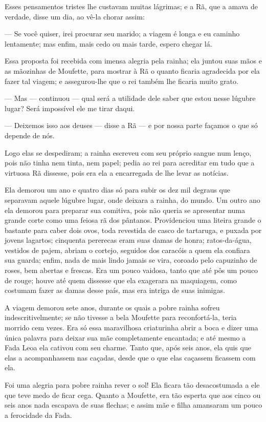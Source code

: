 Esses pensamentos tristes lhe custavam muitas lágrimas; e a Rã, que a
amava de verdade, disse um dia, ao vê-la chorar assim:

— Se você quiser, irei procurar seu marido; a viagem é longa e eu
caminho lentamente; mas enfim, mais cedo ou mais tarde, espero chegar
lá.

Essa proposta foi recebida com imensa alegria pela rainha; ela juntou
suas mãos e as mãozinhas de Moufette, para mostrar à Rã o quanto
ficaria agradecida por ela fazer tal viagem; e assegurou-lhe que o
rei também lhe ficaria muito grato. 

— Mas — continuou — qual será a utilidade dele saber que estou nesse
lúgubre lugar? Será impossível ele me tirar daqui.

— Deixemos isso aos deuses — disse a Rã — e por nossa parte façamos o
que só depende de nós.

Logo elas se despediram; a rainha escreveu com seu próprio sangue num
lenço, pois não tinha nem tinta, nem papel; pedia ao rei para
acreditar em tudo que a virtuosa Rã dissesse, pois era ela a
encarregada de lhe levar as notícias.

Ela demorou um ano e quatro dias só para subir os dez mil degraus que
separavam aquele lúgubre lugar, onde deixara a rainha, do mundo. Um
outro ano ela demorou para preparar sua comitiva, pois não queria se
apresentar numa grande corte como uma feiosa rã dos pântanos.
Providenciou uma liteira grande o bastante para caber dois ovos, toda
revestida de casco de tartaruga, e puxada por jovens lagartos;
cinquenta pererecas eram suas damas de honra; ratos-da-água, vestidos
de pajem, abriam o cortejo, seguidos dos caracóis a quem ela confiara
sua guarda; enfim, nada de mais lindo jamais se vira, coroado pelo
capuzinho de roses, bem abertas e frescas. Era um pouco vaidosa,
tanto que até pôs um pouco de rouge; houve até quem dissesse que ela
exagerara na maquiagem, como costumam fazer as damas desse país, mas
era intriga de suas inimigas.

A viagem demorou sete anos, durante os quais a pobre rainha sofreu
indescritivelmente; se não tivesse a bela Moufette para
reconfortá-la, teria morrido cem vezes. Era só essa maravilhosa
criaturinha abrir a boca e dizer uma única palavra para deixar sua
mãe completamente encantada; e até mesmo a Fada Leoa ela cativou com
seu charme. Tanto que, após seis anos, ela quis que elas a
acompanhassem nas caçadas, desde que o que elas caçassem ficassem com
ela. 

Foi uma alegria para pobre rainha rever o sol! Ela ficara tão
desacostumada a ele que teve medo de ficar cega. Quanto a Moufette,
era tão esperta que aos cinco ou seis anos nada escapava de suas
flechas; e assim mãe e filha amansaram um pouco a ferocidade da Fada.

